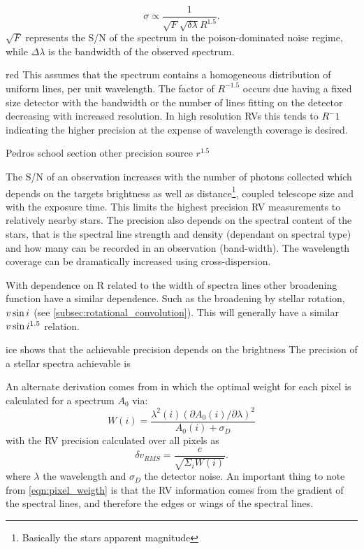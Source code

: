 \begin{equation}
\sigma \propto \frac{1}{\sqrt{F} \sqrt{\delta \lambda} R^{1.5}}.
\end{equation}
$\sqrt{F}$ represents the S/N of the spectrum in the poison-dominated noise regime, while $\Delta \lambda$ is the bandwidth of the observed spectrum. {red{} This assumes that the spectrum contains a homogeneous distribution of uniform lines, per unit wavelength.
The factor of $R^{-1.5}$ occurs due having a fixed size detector with the bandwidth or the number of lines fitting on the detector decreasing with increased resolution. In high resolution  RVs this tends to $R^-{1}$ indicating the higher precision at the expense of wavelength coverage is desired.

Pedros school section other precision source \({r}^{1.5}\)\todo{}

The S/N of an observation increases with the number of photons collected which depends on the targets brightness as well as distance\footnote{Basically the stars apparent magnitude}, coupled telescope size and with the exposure time. This limits the highest precision RV measurements to relatively nearby stars. The precision also depends on the spectral content of the stars, that is the spectral line strength and density (dependant on spectral type) and how many can be recorded in an observation (band-width). The wavelength coverage can be dramatically increased using cross-dispersion.

With dependence on R related to the width of spectra lines other broadening function have a similar dependence. Such as the broadening by stellar rotation, $v\sin{i}$ (see \cref{subsec:rotational_convolution}). This will generally have a similar $v\sin{i}^{1.5}$ relation.

ice shows that the achievable precision depends on the brightness
The precision of a stellar spectra achievable is

An alternate derivation comes from \citet{bouchy_fundamental_2001} in which the optimal weight for each pixel is calculated for a spectrum $A_0$ via:
\begin{equation}
    W(i) = \frac{\lambda^{2}(i) {(\partial A_0(i)/\partial\lambda)}^{2}}{A_0(i) + \sigma_D} \label{eqn:pixel_weigth}
\end{equation}
with the RV precision calculated over all pixels as
\begin{equation}
    \delta v_{RMS} = \frac{c}{\sqrt{\Sigma_i W(i)}}.
\end{equation}
where $\lambda$ the wavelength and $\sigma_D$ the detector noise. An important thing to note from \cref{eqn:pixel_weigth} is that the RV information comes from the gradient of the spectral lines, and therefore the edges or wings of the spectral lines.

}
